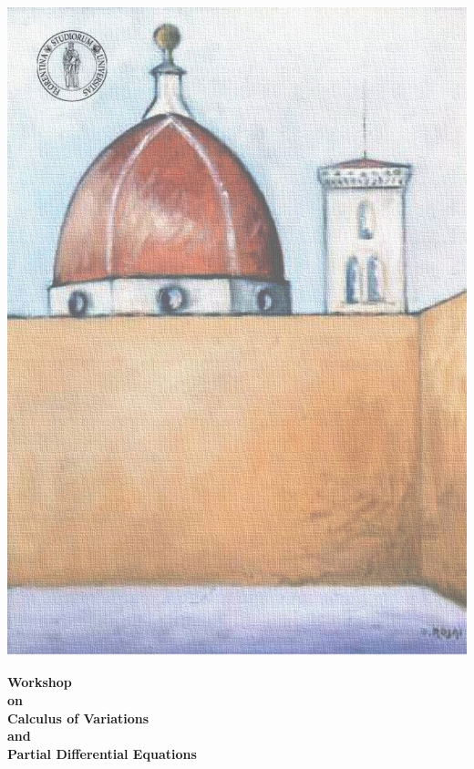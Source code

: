 \documentclass[a4paper]{article}
\newcommand{\buhh}[1]{\textsf{#1}\hspace{2.5cm}\mbox{}\\}
\begin{document}
\color{my}
\begin{center}
\includegraphics[scale=0.59]{sfondoLocandina}
\\
\vspace{-29cm}
\end{center}
\hfill
\begin{minipage}{15cm}
\begin{flushright}
\vspace{0.5cm}
\bf
\Huge
\buhh{Workshop}
\huge
\buhh{on}
\Huge
\buhh{Calculus of Variations}
\huge
\buhh{and}
\Huge
\buhh{Partial Differential Equations}
\end{flushright}
\end{minipage}
\end{document}
